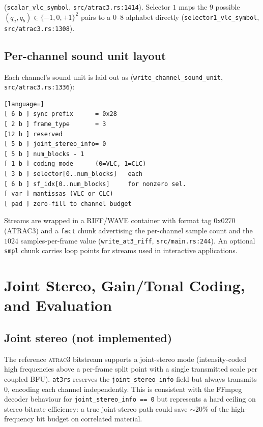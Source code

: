 \documentclass[11pt]{article}
\begin{document}
\noindent
(\texttt{scalar\_vlc\_symbol}, \texttt{src/atrac3.rs:1414}). Selector \(1\)
maps the \(9\) possible \((q_a,q_b) \in \{-1,0,+1\}^2\) pairs to a
\(0\)--\(8\) alphabet directly (\texttt{selector1\_vlc\_symbol},
\texttt{src/atrac3.rs:1308}).

\subsection{Per-channel sound unit layout}

Each channel's sound unit is laid out as (\texttt{write\_channel\_sound\_unit},
\texttt{src/atrac3.rs:1336}):

\begin{lstlisting}[language=]
[ 6 b ] sync prefix      = 0x28
[ 2 b ] frame_type       = 3
[12 b ] reserved
[ 5 b ] joint_stereo_info= 0
[ 5 b ] num_blocks - 1
[ 1 b ] coding_mode      (0=VLC, 1=CLC)
[ 3 b ] selector[0..num_blocks]   each
[ 6 b ] sf_idx[0..num_blocks]     for nonzero sel.
[ var ] mantissas (VLC or CLC)
[ pad ] zero-fill to channel budget
\end{lstlisting}

\noindent
Streams are wrapped in a RIFF/WAVE container with format tag
\(0\text{x}0270\) (ATRAC3) and a \texttt{fact} chunk advertising the per-channel
sample count and the \(1024\) samples-per-frame value
(\texttt{write\_at3\_riff}, \texttt{src/main.rs:244}). An optional
\texttt{smpl} chunk carries loop points for streams used in interactive
applications.

\section{Joint Stereo, Gain/Tonal Coding, and Evaluation}
\label{sec:status}

\subsection{Joint stereo (not implemented)}

The reference \textsc{atrac3} bitstream supports a joint-stereo mode
(intensity-coded high frequencies above a per-frame split point with a
single transmitted scale per coupled BFU). \texttt{at3rs} reserves the
\texttt{joint\_stereo\_info} field but always transmits \(0\), encoding
each channel independently. This is consistent with the FFmpeg decoder
behaviour for \texttt{joint\_stereo\_info == 0} but represents a hard
ceiling on stereo bitrate efficiency: a true joint-stereo path could save
\(\sim\!20\%\) of the high-frequency bit budget on correlated material.
\end{document}
